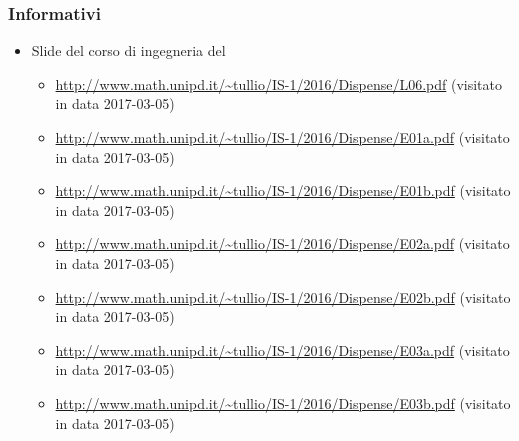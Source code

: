   \subsubsection{Informativi}
    \begin{itemize}
    	\item Slide del corso di ingegneria del 
    	\begin{itemize}
    		\item \url{http://www.math.unipd.it/~tullio/IS-1/2016/Dispense/L06.pdf} (visitato in data 2017-03-05)
    		\item \url{http://www.math.unipd.it/~tullio/IS-1/2016/Dispense/E01a.pdf} (visitato in data 2017-03-05)
    		\item \url{http://www.math.unipd.it/~tullio/IS-1/2016/Dispense/E01b.pdf} (visitato in data 2017-03-05)
    		\item \url{http://www.math.unipd.it/~tullio/IS-1/2016/Dispense/E02a.pdf} (visitato in data 2017-03-05)
    		\item \url{http://www.math.unipd.it/~tullio/IS-1/2016/Dispense/E02b.pdf} (visitato in data 2017-03-05)
    		\item \url{http://www.math.unipd.it/~tullio/IS-1/2016/Dispense/E03a.pdf} (visitato in data 2017-03-05)
    		\item \url{http://www.math.unipd.it/~tullio/IS-1/2016/Dispense/E03b.pdf} (visitato in data 2017-03-05)
    	\end{itemize}
    \end{itemize}